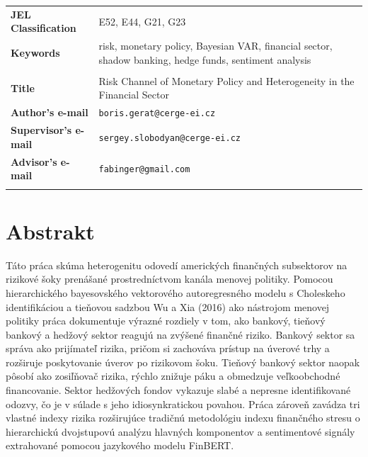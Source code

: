 \documentclass[12pt,a4paper]{report}
\begin{document}
\begin{tabular}{lp{8.6cm}}
  \textbf{JEL Classification} & E52, E44, G21, G23 \\
  \textbf{Keywords}           & risk, monetary policy, Bayesian VAR, financial
                                sector, shadow banking, hedge funds,
                                sentiment analysis \\
                              & \\
   \textbf{Title}              & Risk Channel of Monetary Policy and Heterogeneity in the Financial Sector \\
  \textbf{Author's e-mail}    & \texttt{boris.gerat@cerge-ei.cz} \\
  \textbf{Supervisor's e-mail}& \texttt{sergey.slobodyan@cerge-ei.cz} \\
  \textbf{Advisor's e-mail}   & \texttt{fabinger@gmail.com} \\\\
\end{tabular}

\bigskip

\section*{Abstrakt}

T\'{a}to pr\'{a}ca sk\'{u}ma heterogenitu odoved\'{i} americk\'{y}ch
finan\v{c}n\'{y}ch subsektorov na rizikov\'{e} \v{s}oky pren\'{a}\v{s}an\'{e}
prostredn\'{i}ctvom kan\'{a}la menovej politiky. Pomocou hierarchick\'{e}ho
bayesovsk\'{e}ho vektorov\'{e}ho autoregresn\'{e}ho modelu s Choleskeho
identifik\'{a}ciou a tie\v{n}ovou sadzbou Wu a Xia (2016) ako n\'{a}strojom
menovej politiky pr\'{a}ca dokumentuje v\'{y}razn\'{e} rozdiely v tom, ako
bankov\'{y}, tie\v{n}ov\'{y} bankov\'{y} a hed\v{z}ov\'{y} sektor reaguj\'{u}
na zv\'{y}\v{s}en\'{e} finan\v{c}n\'{e} riziko. Bankov\'{y} sektor sa
spr\'{a}va ako prij\'{i}mate\v{l} rizika, pri\v{c}om si zachov\'{a}va
pr\'{i}stup na \'{u}verov\'{e} trhy a roz\v{s}iruje poskytovanie \'{u}verov
po rizikovom \v{s}oku. Tie\v{n}ov\'{y} bankov\'{y} sektor naopak p\^{o}sob\'{i}
ako zosi\v{l}\v{n}ova\v{c} rizika, r\'{y}chlo zni\v{z}uje p\'{a}ku a obmedzuje
ve\v{l}koobchodn\'{e} financovanie. Sektor hed\v{z}ov\'{y}ch fondov vykazuje
slab\'{e} a nepresne identifikovan\'{e} odozvy, \v{c}o je v s\'{u}lade s jeho
idiosynkratickou povahou. Pr\'{a}ca z\'{a}rove\v{n} zav\'{a}dza tri vlastn\'{e}
indexy rizika roz\v{s}iruj\'{u}ce tradi\v{c}n\'{u} metodol\'{o}giu indexu
finan\v{c}n\'{e}ho stresu o hierarchick\'{u} dvojstupov\'{u} anal\'{y}zu
hlavn\'{y}ch komponentov a sentimentov\'{e} sign\'{a}ly extrahovan\'{e}
pomocou jazykov\'{e}ho modelu FinBERT.
\end{document}
